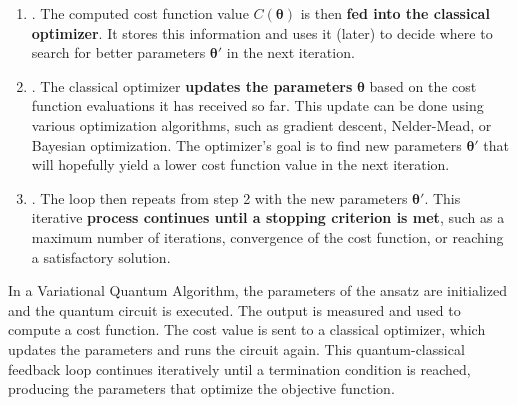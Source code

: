 \begin{enumerate}
    
    \item {}. The computed cost function value $C(\boldsymbol{\theta})$ is then \textbf{fed into the classical optimizer}. It stores this information and uses it (later) to decide where to search for better parameters $\boldsymbol{\theta}'$ in the next iteration.
    
    
    \item {}. The classical optimizer \textbf{updates the parameters} $\boldsymbol{\theta}$ based on the cost function evaluations it has received so far. This update can be done using various optimization algorithms, such as gradient descent, Nelder-Mead, or Bayesian optimization. The optimizer's goal is to find new parameters $\boldsymbol{\theta}'$ that will hopefully yield a lower cost function value in the next iteration.
    

    \item {}. The loop then repeats from step 2 with the new parameters $\boldsymbol{\theta}'$. This iterative \textbf{process continues until a stopping criterion is met}, such as a maximum number of iterations, convergence of the cost function, or reaching a satisfactory solution.
\end{enumerate}
In a Variational Quantum Algorithm, the parameters of the ansatz are initialized and the quantum circuit is executed. The output is measured and used to compute a cost function. The cost value is sent to a classical optimizer, which updates the parameters and runs the circuit again. This quantum-classical feedback loop continues iteratively until a termination condition is reached, producing the parameters that optimize the objective function.

